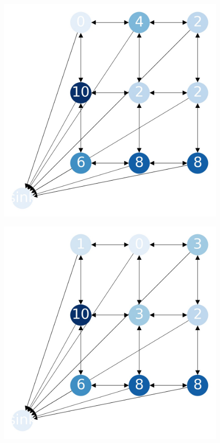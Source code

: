 \documentclass{beamer}
\begin{document}
    \begin{frame}
      \begin{figure}[h!]
        \centering
          \includegraphics[scale=0.25]{sandpile_-10}
      \end{figure}
    \end{frame}
    

    \begin{frame}
      \begin{figure}[h!]
        \centering
          \includegraphics[scale=0.25]{sandpile_-11}
      \end{figure}
    \end{frame}
    
\end{document}

